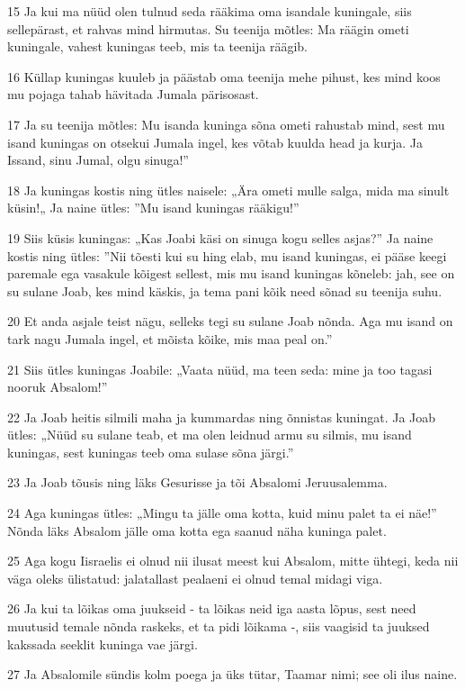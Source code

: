 \par 15 Ja kui ma nüüd olen tulnud seda rääkima oma isandale kuningale, siis sellepärast, et rahvas mind hirmutas. Su teenija mõtles: Ma räägin ometi kuningale, vahest kuningas teeb, mis ta teenija räägib.
\par 16 Küllap kuningas kuuleb ja päästab oma teenija mehe pihust, kes mind koos mu pojaga tahab hävitada Jumala pärisosast.
\par 17 Ja su teenija mõtles: Mu isanda kuninga sõna ometi rahustab mind, sest mu isand kuningas on otsekui Jumala ingel, kes võtab kuulda head ja kurja. Ja Issand, sinu Jumal, olgu sinuga!”
\par 18 Ja kuningas kostis ning ütles naisele: „Ära ometi mulle salga, mida ma sinult küsin!„ Ja naine ütles: ”Mu isand kuningas rääkigu!”
\par 19 Siis küsis kuningas: „Kas Joabi käsi on sinuga kogu selles asjas?” Ja naine kostis ning ütles: ”Nii tõesti kui su hing elab, mu isand kuningas, ei pääse keegi paremale ega vasakule kõigest sellest, mis mu isand kuningas kõneleb: jah, see on su sulane Joab, kes mind käskis, ja tema pani kõik need sõnad su teenija suhu.
\par 20 Et anda asjale teist nägu, selleks tegi su sulane Joab nõnda. Aga mu isand on tark nagu Jumala ingel, et mõista kõike, mis maa peal on.”
\par 21 Siis ütles kuningas Joabile: „Vaata nüüd, ma teen seda: mine ja too tagasi nooruk Absalom!”
\par 22 Ja Joab heitis silmili maha ja kummardas ning õnnistas kuningat. Ja Joab ütles: „Nüüd su sulane teab, et ma olen leidnud armu su silmis, mu isand kuningas, sest kuningas teeb oma sulase sõna järgi.”
\par 23 Ja Joab tõusis ning läks Gesurisse ja tõi Absalomi Jeruusalemma.
\par 24 Aga kuningas ütles: „Mingu ta jälle oma kotta, kuid minu palet ta ei näe!” Nõnda läks Absalom jälle oma kotta ega saanud näha kuninga palet.
\par 25 Aga kogu Iisraelis ei olnud nii ilusat meest kui Absalom, mitte ühtegi, keda nii väga oleks ülistatud: jalatallast pealaeni ei olnud temal midagi viga.
\par 26 Ja kui ta lõikas oma juukseid - ta lõikas neid iga aasta lõpus, sest need muutusid temale nõnda raskeks, et ta pidi lõikama -, siis vaagisid ta juuksed kakssada seeklit kuninga vae järgi.
\par 27 Ja Absalomile sündis kolm poega ja üks tütar, Taamar nimi; see oli ilus naine.
